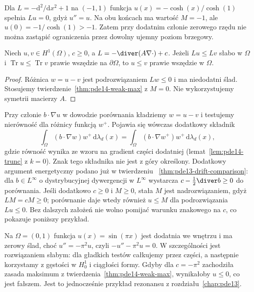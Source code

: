 \begin{uwaga}
Dla $L=-\mathrm d^2/\mathrm dx^2+1$ na $(-1,1)$
funkcja $u(x)=-\cosh(x)/\cosh(1)$ spełnia $Lu=0$,
gdyż $u''=u$. Na obu końcach ma wartość $M=-1$,
ale $u(0)=-1/\cosh(1)>-1$.
Zatem przy dodatnim członie zerowego rzędu nie można
zastąpić ograniczenia przez dowolny ujemny poziom brzegowy.
\end{uwaga}

\begin{wniosek}[Porównanie]
\label{cor:pde14-compare}
Niech $u,v\in H^1(\Omega)$, $c\ge0$, a
$L=-\diver(A\nabla\cdot)+c$. Jeżeli $Lu\le Lv$ słabo w
$\Omega$ i $\operatorname{Tr}u\le\operatorname{Tr}v$ prawie
wszędzie na $\partial\Omega$, to $u\le v$ prawie wszędzie
w $\Omega$.
\end{wniosek}
\begin{proof}
Różnica $w=u-v$ jest podrozwiązaniem $Lw\le0$ i ma
niedodatni ślad. Stosujemy twierdzenie~\ref{thm:pde14-weak-max}
z $M=0$. Nie wykorzystujemy symetrii macierzy $A$.
\end{proof}

\begin{uwaga}
Przy członie $b\cdot\nabla u$ w dowodzie porównania
kładziemy $w=u-v$ i testujemy nierówność dla różnicy
funkcją $w^+$. Pojawia się wówczas dodatkowy składnik
\[
 \int_\Omega (b\cdot\nabla w)w^+\,\mathrm d\lambda_d(x)
 =\int_\Omega (b\cdot\nabla w^+)w^+\,\mathrm d\lambda_d(x),
\]
gdzie równość wynika ze wzoru na gradient części
dodatniej (lemat~\ref{lem:pde14-trunc} z $k=0$).
Znak tego składnika nie jest z góry określony. Dodatkowy argument
energetyczny podano już w twierdzeniu
~\ref{thm:pde13-drift-comparison}: dla $b\in L^\infty$
o dystrybucyjnej dywergencji w $L^\infty$ wystarcza
$c-\tfrac12\diver b\ge0$ do porównania.
Jeśli dodatkowo $c\ge0$ i $M\ge0$, stała $M$ jest
nadrozwiązaniem, gdyż $LM=cM\ge0$; porównanie daje
wtedy również $u\le M$ dla podrozwiązania $Lu\le0$.
Bez dalszych założeń nie wolno pomijać warunku znakowego
na $c$, co pokazuje poniższy przykład.
\end{uwaga}

\begin{kontrprzyklad}
\label{ex:pde14-negative-c}
Na $\Omega=(0,1)$ funkcja $u(x)=\sin(\pi x)$ jest dodatnia
we wnętrzu i ma zerowy ślad, choć $u''=-\pi^2u$,
czyli $-u''-\pi^2u=0$.
W szczególności jest rozwiązaniem słabym: dla gładkich
testów całkujemy przez części, a następnie korzystamy
z gęstości w $H_0^1$ i ciągłości formy. Gdyby dla $c=-\pi^2$ zachodziła zasada
maksimum z twierdzenia~\ref{thm:pde14-weak-max},
wynikałoby $u\le0$, co jest fałszem. Jest to jednocześnie
przykład rezonansu z rozdziału~\ref{chap:pde13}.
\end{kontrprzyklad}

